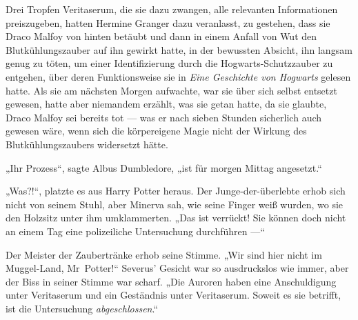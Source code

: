 Drei Tropfen Veritaserum, die sie dazu zwangen, alle relevanten Informationen preiszugeben, hatten Hermine Granger dazu veranlasst, zu gestehen, dass sie Draco Malfoy von hinten betäubt und dann in einem Anfall von Wut den Blutkühlungszauber auf ihn gewirkt hatte, in der bewussten Absicht, ihn langsam genug zu töten, um einer Identifizierung durch die Hogwarts-Schutzzauber zu entgehen, über deren Funktionsweise sie in \emph{Eine Geschichte von Hogwarts} gelesen hatte. Als sie am nächsten Morgen aufwachte, war sie über sich selbst entsetzt gewesen, hatte aber niemandem erzählt, was sie getan hatte, da sie glaubte, Draco Malfoy sei bereits tot — was er nach sieben Stunden sicherlich auch gewesen wäre, wenn sich die körpereigene Magie nicht der Wirkung des Blutkühlungszaubers widersetzt hätte.

„Ihr Prozess“, sagte Albus Dumbledore, „ist für morgen Mittag angesetzt.“

„Was?!“, platzte es aus Harry Potter heraus. Der Junge-der-überlebte erhob sich nicht von seinem Stuhl, aber Minerva sah, wie seine Finger weiß wurden, wo sie den Holzsitz unter ihm umklammerten.
„Das ist verrückt! Sie können doch nicht an einem Tag eine polizeiliche Untersuchung durchführen —“

Der Meister der Zaubertränke erhob seine Stimme.
„Wir sind hier nicht im Muggel-Land, Mr~Potter!“ Severus’ Gesicht war so ausdruckslos wie immer, aber der Biss in seiner Stimme war scharf.
„Die Auroren haben eine Anschuldigung unter Veritaserum und ein Geständnis unter Veritaserum. Soweit es sie betrifft, ist die Untersuchung \emph{abgeschlossen}.“

